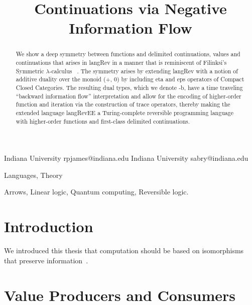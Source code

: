 \documentclass[preprint]{sigplanconf}
\newcommand{\lcal}{\ensuremath{\lambda}-calculus}
\begin{document}
\CopyrightYear{}
\copyrightdata{}
\titlebanner{}
\preprintfooter{}

\title{Continuations via Negative Information Flow}
           {Indiana University}
           {rpjames@indiana.edu}
           {Indiana University}
           {sabry@indiana.edu}
\maketitle

\begin{abstract}
We show a deep symmetry between functions and delimited continuations,
values and continuations that arises in {{langRev}} in a manner that
is reminiscent of Filinksi's Symmetric \lcal
~\cite{Filinski:1989:DCI:648332.755574}. The symmetry arises by
extending {{langRev}} with a notion of additive duality over the
monoid {{(+, 0)}} by including {{eta}} and {{eps}} operators of
Compact Closed Categories. The resulting dual types, which we denote
{{-b}}, have a time traveling ``backward information flow''
interpretation and allow for the encoding of higher-order function and
iteration via the construction of {{trace}} operators, thereby making
the extended language {{langRevEE}} a Turing-complete reversible
programming language with higher-order functions and first-class
delimited continuations.
\end{abstract}


\terms
Languages, Theory

\keywords Arrows, Linear logic, Quantum computing, Reversible logic.

\section{Introduction}

We introduced this thesis that computation should be based on isomorphisms
that preserve information~\cite{infeffects}.

\section{Value Producers and Consumers}
\end{document}
